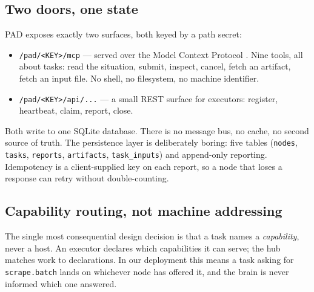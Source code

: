 \documentclass{article}
\begin{document}
\subsection{Two doors, one state}

PAD exposes exactly two surfaces, both keyed by a path secret:

\begin{itemize}[leftmargin=1.2em,itemsep=2pt,topsep=3pt]
  \item \texttt{/pad/<KEY>/mcp} --- served over the Model Context Protocol
        \cite{mcpspec2025}. Nine tools, all about tasks: read the situation, submit,
        inspect, cancel, fetch an artifact, fetch an input file. No shell, no
        filesystem, no machine identifier.
  \item \texttt{/pad/<KEY>/api/...} --- a small REST surface for executors:
        register, heartbeat, claim, report, close.
\end{itemize}

Both write to one SQLite database. There is no message bus, no cache, no second
source of truth. The persistence layer is deliberately boring: five tables
(\texttt{nodes}, \texttt{tasks}, \texttt{reports}, \texttt{artifacts},
\texttt{task\_inputs}) and append-only reporting. Idempotency is a client-supplied
key on each report, so a node that loses a response can retry without double-counting.

\subsection{Capability routing, not machine addressing}

The single most consequential design decision is that a task names a
\emph{capability}, never a host. An executor declares which capabilities it can serve;
the hub matches work to declarations. In our deployment this means a task asking for
\texttt{scrape.batch} lands on whichever node has offered it, and the brain is never
informed which one answered.
\end{document}
